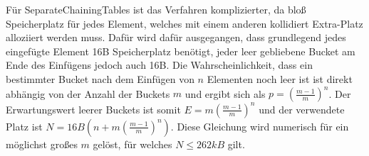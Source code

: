 Für SeparateChainingTables ist das Verfahren komplizierter, da bloß Speicherplatz für jedes Element, welches mit einem anderen kollidiert Extra-Platz alloziiert werden muss. Dafür wird dafür ausgegangen, dass grundlegend jedes eingefügte Element 16B Speicherplatz benötigt, jeder leer gebliebene Bucket am Ende des Einfügens jedoch auch 16B. Die Wahrscheinlichkeit, dass ein bestimmter Bucket nach dem Einfügen von $n$ Elementen noch leer ist ist direkt abhängig von der Anzahl der Buckets $m$ und ergibt sich als $p = \left(\frac{m-1}{m}\right)^n$. Der Erwartungswert leerer Buckets ist somit $E = m\left(\frac{m-1}{m}\right)^n$ und der verwendete Platz ist $N = 16B\left(n + m\left(\frac{m-1}{m}\right)^n\right)$. Diese Gleichung wird numerisch für ein möglichst großes $m$ gelöst, für welches $N \le 262kB$ gilt.